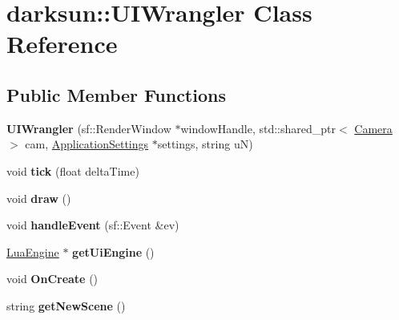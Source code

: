\hypertarget{classdarksun_1_1_u_i_wrangler}{}\section{darksun\+::U\+I\+Wrangler Class Reference}
\label{classdarksun_1_1_u_i_wrangler}
\subsection*{Public Member Functions}
\begin{DoxyCompactItemize}
\item 
\mbox{\label{classdarksun_1_1_u_i_wrangler_afb4a7a4d7e072269576a74aae573adab}} 
{\bfseries U\+I\+Wrangler} (sf\+::\+Render\+Window $\ast$window\+Handle, std\+::shared\+\_\+ptr$<$ \mbox{\hyperlink{classdarksun_1_1_camera}{Camera}} $>$ cam, \mbox{\hyperlink{classdarksun_1_1_application_settings}{Application\+Settings}} $\ast$settings, string uN)
\item 
\mbox{\label{classdarksun_1_1_u_i_wrangler_a22a3c040f0c17de85a7422aebf1514aa}} 
void {\bfseries tick} (float delta\+Time)
\item 
\mbox{\label{classdarksun_1_1_u_i_wrangler_a276cf47e583df8131be7e3f3dd75c6f7}} 
void {\bfseries draw} ()
\item 
\mbox{\label{classdarksun_1_1_u_i_wrangler_a0935a7e1e362e74ddfb55e9fbfc8a21d}} 
void {\bfseries handle\+Event} (sf\+::\+Event \&ev)
\item 
\mbox{\label{classdarksun_1_1_u_i_wrangler_a2a180950c63458828ce08368998b4313}} 
\mbox{\hyperlink{classdarksun_1_1_lua_engine}{Lua\+Engine}} $\ast$ {\bfseries get\+Ui\+Engine} ()
\item 
\mbox{\label{classdarksun_1_1_u_i_wrangler_a4b3aa11753fd8f459b3097d2a8afc12d}} 
void {\bfseries On\+Create} ()
\item 
\mbox{\label{classdarksun_1_1_u_i_wrangler_a359daa76499e4ef2593b90eb49d09d54}} 
string {\bfseries get\+New\+Scene} ()
\item 

\end{DoxyCompactItemize}
